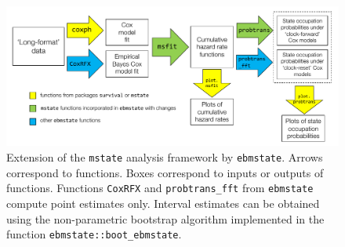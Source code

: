     \begin{figure}[h] 
    \centering         
    \includegraphics[width=13.5cm, angle=0]{figures/workflow0.pdf} %
    \vspace*{0.25cm}     %
    \caption{Extension of the \texttt{mstate} analysis framework by \texttt{ebmstate}. Arrows correspond to functions. Boxes correspond to inputs or outputs of functions. Functions \texttt{CoxRFX} and \texttt{probtrans\_fft} from \texttt{ebmstate} compute point estimates only.  Interval estimates can be obtained using the non-parametric bootstrap algorithm implemented in the function \texttt{ebmstate::boot\_ebmstate}.}      
    \label{fig:workflow} %
    \end{figure} 
    
